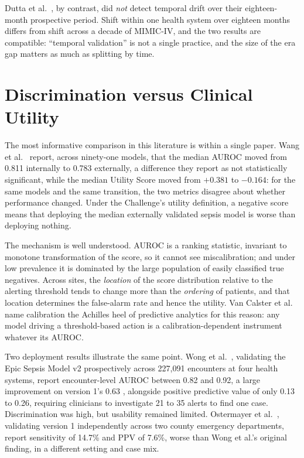 Dutta et al.\ \cite{dutta2026performance}, by contrast, did \emph{not} detect
temporal drift over their eighteen-month prospective period. Shift within one
health system over eighteen months differs from shift across a decade of
MIMIC-IV, and the two results are compatible: ``temporal validation'' is not a
single practice, and the size of the era gap matters as much as splitting by
time.


\section{Discrimination versus Clinical Utility}
\label{sec:auroc_illusion}

The most informative comparison in this literature is within a single paper.
Wang et al.\ \cite{wang2025srpm} report, across ninety-one models, that
the median AUROC moved from 0.811 internally to 0.783 externally, a
difference they report as not statistically significant, while the median
Utility Score moved from $+0.381$ to $-0.164$: for the same models and the
same transition, the two metrics disagree about whether performance changed.
Under the Challenge's utility definition, a negative score means that deploying
the median externally validated sepsis model is worse than deploying nothing.

The mechanism is well understood. AUROC is a ranking statistic, invariant to
monotone transformation of the score, so it cannot see miscalibration; and
under low prevalence it is dominated by the large population of easily
classified true negatives. Across sites, the \emph{location} of the score
distribution relative to the alerting threshold tends to change more than the
\emph{ordering} of patients, and that location determines the false-alarm rate
and hence the utility. Van Calster et al.\
\cite{vancalster2019calibration} name calibration the Achilles heel of
predictive analytics for this reason: any model driving a threshold-based
action is a calibration-dependent instrument whatever its AUROC.

Two deployment results illustrate the same point. Wong et
al.\ \cite{wong2026epic}, validating the Epic Sepsis Model v2 prospectively
across 227,091 encounters at four health systems, report encounter-level AUROC
between 0.82 and 0.92, a large improvement on version 1's 0.63
\cite{wong2021epic}, alongside positive predictive value of only 0.13 to
0.26, requiring clinicians to investigate 21 to 35 alerts to find one case.
Discrimination was high, but usability remained limited. Ostermayer et al.\
\cite{ostermayer2024external}, validating version 1 independently across two
county emergency departments, report sensitivity of 14.7\% and PPV of 7.6\%,
worse than Wong et al.'s original finding, in a different setting and case mix.

